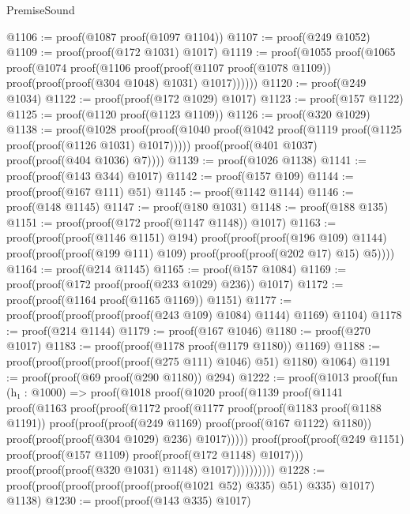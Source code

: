 \begin{lexlean}{PremiseSound}
\begin{coremodule}
@1106 := proof(@1087 proof(@1097 @1104))
@1107 := proof(@249 @1052)
@1109 := proof(proof(@172 @1031) @1017)
@1119 := proof(@1055
      proof(@1065
          proof(@1074
              proof(@1106
                  proof(proof(@1107 proof(@1078 @1109))
                      proof(proof(proof(@304 @1048) @1031) @1017))))))
@1120 := proof(@249 @1034)
@1122 := proof(proof(@172 @1029) @1017)
@1123 := proof(@157 @1122)
@1125 := proof(@1120 proof(@1123 @1109))
@1126 := proof(@320 @1029)
@1138 := proof(@1028
      proof(proof(@1040 proof(@1042 proof(@1119 proof(@1125 proof(proof(@1126 @1031) @1017)))))
          proof(proof(@401 @1037) proof(proof(@404 @1036) @7))))
@1139 := proof(@1026 @1138)
@1141 := proof(proof(@143 @344) @1017)
@1142 := proof(@157 @109)
@1144 := proof(proof(@167 @111) @51)
@1145 := proof(@1142 @1144)
@1146 := proof(@148 @1145)
@1147 := proof(@180 @1031)
@1148 := proof(@188 @135)
@1151 := proof(proof(@172 proof(@1147 @1148)) @1017)
@1163 := proof(proof(proof(@1146 @1151) @194)
      proof(proof(proof(@196 @109) @1144)
          proof(proof(proof(@199 @111) @109) proof(proof(proof(@202 @17) @15) @5))))
@1164 := proof(@214 @1145)
@1165 := proof(@157 @1084)
@1169 := proof(proof(@172 proof(proof(@233 @1029) @236)) @1017)
@1172 := proof(proof(@1164 proof(@1165 @1169)) @1151)
@1177 := proof(proof(proof(proof(proof(@243 @109) @1084) @1144) @1169) @1104)
@1178 := proof(@214 @1144)
@1179 := proof(@167 @1046)
@1180 := proof(@270 @1017)
@1183 := proof(proof(@1178 proof(@1179 @1180)) @1169)
@1188 := proof(proof(proof(proof(proof(@275 @111) @1046) @51) @1180) @1064)
@1191 := proof(proof(@69 proof(@290 @1180)) @294)
@1222 := proof(@1013
      proof(fun (h₁ : @1000) =>
        proof(@1018
            proof(@1020
                proof(@1139
                    proof(@1141
                        proof(@1163
                            proof(proof(@1172
                                  proof(@1177
                                      proof(proof(@1183 proof(@1188 @1191))
                                          proof(proof(proof(@249 @1169)
                                                proof(proof(@167 @1122) @1180))
                                              proof(proof(proof(@304 @1029) @236) @1017)))))
                                proof(proof(proof(@249 @1151)
                                      proof(proof(@157 @1109) proof(proof(@172 @1148) @1017)))
                                    proof(proof(proof(@320 @1031) @1148) @1017))))))))))
@1228 := proof(proof(proof(proof(proof(proof(@1021 @52) @335) @51) @335) @1017) @1138)
@1230 := proof(proof(@143 @335) @1017)

\end{coremodule}
\end{lexlean}
